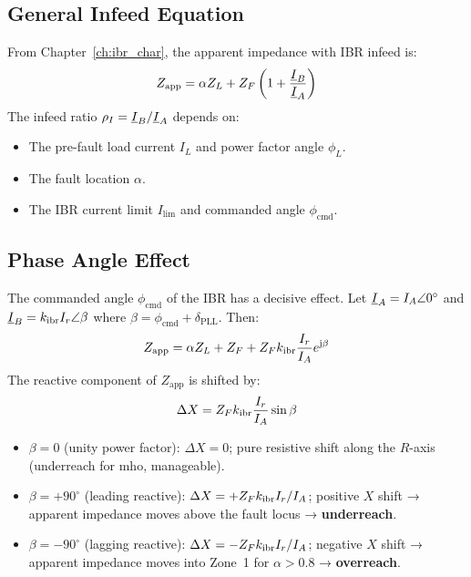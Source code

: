 \subsection{General Infeed Equation}

From Chapter~\ref{ch:ibr_char}, the apparent impedance with IBR infeed is:
\begin{equation}
  Z_\mathrm{app} = \alpha Z_L + Z_F\left(1 + \frac{\underline{I}_B}{\underline{I}_A}\right)
  \label{eq:ch5_zapp_general}
\end{equation}
The infeed ratio $\rho_I = \underline{I}_B/\underline{I}_A$ depends on:
\begin{itemize}
\item The pre-fault load current $I_L$ and power factor angle $\phi_L$.
\item The fault location $\alpha$.
\item The IBR current limit $I_\mathrm{lim}$ and commanded angle $\phi_\mathrm{cmd}$.
\end{itemize}

\subsection{Phase Angle Effect}

The commanded angle $\phi_\mathrm{cmd}$ of the IBR has a decisive effect.
Let $\underline{I}_A = I_A\angle 0^\circ{}$ and $\underline{I}_B = k_\mathrm{ibr} I_r \angle \beta$
where $\beta = \phi_\mathrm{cmd} + \delta_\mathrm{PLL}$. Then:
\begin{equation}
  Z_\mathrm{app} = \alpha Z_L + Z_F
    + Z_F k_\mathrm{ibr} \frac{I_r}{I_A} e^{\mathrm{j}\beta}
  \label{eq:ch5_zapp_phase}
\end{equation}
The reactive component of $Z_\mathrm{app}$ is shifted by:
\begin{equation}
  \Delta X = Z_F k_\mathrm{ibr} \frac{I_r}{I_A} \sin\beta
  \label{eq:ch5_dx}
\end{equation}
\begin{itemize}
\item $\beta = 0$ (unity power factor): $\Delta X = 0$; pure resistive
      shift along the $R$-axis (underreach for mho, manageable).
\item $\beta = +90^\circ{}$ (leading reactive): $\Delta X = +Z_Fk_\mathrm{ibr} I_r/I_A$;
      positive $X$ shift → apparent impedance moves above the fault locus
      → \textbf{underreach}.
\item $\beta = -90^\circ{}$ (lagging reactive): $\Delta X = -Z_Fk_\mathrm{ibr} I_r/I_A$;
      negative $X$ shift → apparent impedance moves into Zone~1
      for $\alpha > 0.8$ → \textbf{overreach}.
\end{itemize}

